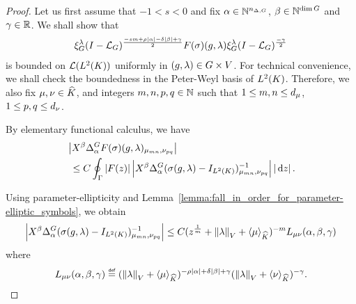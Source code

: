 \begin{proof}
    Let us first assume that $-1 < s < 0$
    and fix $\alpha \in \mathbb{N}^{n_{\Delta, G}}$, $\beta \in \mathbb{N}^{\dim G}$ and $\gamma \in \mathbb{R}$.
    We shall show that
    \begin{align*}
        \xi^{\lambda}_{G} (I - {\mathcal{L}_{G}})^\frac{-sm + \rho \left|{\alpha}\right| - \delta \left|{\beta}\right| + \gamma}{2}
        F(\sigma)(g, \lambda)
        \xi^{\lambda}_{G} (I - {\mathcal{L}_{G}})^\frac{-\gamma}{2}
    \end{align*}
    is bounded on ${\mathcal{L} ({L^{2} (K)})}$ uniformly in $(g, \lambda) \in G \times V$.
    For technical convenience,
    we shall check the boundedness in the Peter-Weyl basis of ${L^{2} (K)}$.
    Therefore, we also fix $\mu, \nu \in {\widehat{K}}$,
    and integers $m, n, p, q \in \mathbb{N}$ such that
    $1 \leq m, n \leq {d_{\mu}}$, $1 \leq p, q \leq {d_{\nu}}$.

    By elementary functional calculus,
    we have
    \begin{align*}
        &\abs {%
            \LeftDifferentialOperator \beta \DifferenceOperator \alpha
            F(\sigma)(g, \lambda)_{\mu_{m n}, \nu_{p q}}
        }\\
        &\ \leq C \oint_{\Gamma} \abs {F(z)}
        \abs {%
            \LeftDifferentialOperator \beta \DifferenceOperator \alpha
            (\sigma(g, \lambda) - \Id {\Lebesgue 2 \CompactGroup})^{-1}_{\mu_{m n}, \nu_{p q}}
        } \abs {\dd z}.
    \end{align*}

    Using parameter-ellipticity and Lemma~\ref{lemma:fall_in_order_for_parameter-elliptic_symbols},
    we obtain
    \begin{align*}
        \abs {%
            \LeftDifferentialOperator \beta \DifferenceOperator \alpha
            (\sigma(g, \lambda) - \Id {\Lebesgue 2 \CompactGroup})^{-1}_{\mu_{m n}, \nu_{p q}}
        }
        \leq
        C
        (z^{\frac 1 m} + \norm [\VectorSpace] \lambda + \JapaneseBracket \CompactGroup \mu)^{-m}
        L_{\mu \nu}(\alpha, \beta, \gamma)
    \end{align*}
    where
    \begin{align*}
        L_{\mu \nu}(\alpha, \beta, \gamma) \defeq
        (\norm [\VectorSpace] \lambda + \JapaneseBracket \CompactGroup \mu)^{-\rho \abs \alpha + \delta \abs \beta + \gamma}
        (\norm [\VectorSpace] \lambda + \JapaneseBracket \CompactGroup \nu)^{-\gamma}.
    \end{align*}


\end{proof}
